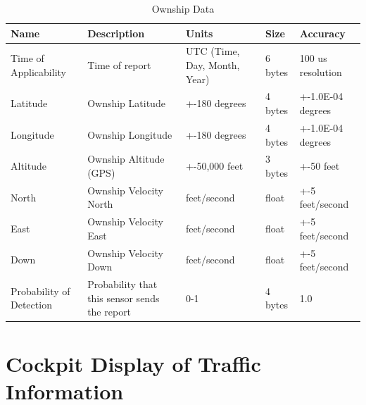 \documentclass[12pt,oneside,letterpaper]{article}
\begin{document}
\begin{table}[H]
\caption{Ownship Data}
\centering
\begin{tabular}{|p{}|p{}|p{}|p{}|p{}|}
 \hline
 Name & Description & Units & Size & Accuracy \\
 \hline
 Time of Applicability & Time of report & UTC (Time, Day, Month, Year) & 6 bytes & 100 us resolution \\
 \hline
 Latitude & Ownship Latitude & +-180 degrees & 4 bytes & +-1.0E-04 degrees \\
 \hline
 Longitude & Ownship Longitude & +-180 degrees & 4 bytes & +-1.0E-04 degrees \\
 \hline
 Altitude & Ownship Altitude (GPS) & +-50,000 feet & 3 bytes & +-50 feet \\
 \hline
 North & Ownship Velocity North & feet/second & float & +-5 feet/second \\
 \hline
 East & Ownship Velocity East & feet/second & float & +-5 feet/second \\
 \hline
 Down & Ownship Velocity Down & feet/second & float & +-5 feet/second \\
 \hline
 Probability of Detection & Probability that this sensor sends the report & 0-1 & 4 bytes & 1.0 \\
 \hline
\end{tabular}
\end{table}

\section{Cockpit Display of Traffic Information}
\end{document}
